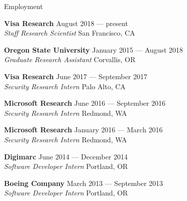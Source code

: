 \documentclass{resume} %
\begin{document}
\begin{rSection}{Employment}

{\bf Visa Research} \hfill {August 2018 --- present}\\
{\emph{Staff Research Scientist } \hfill {San Francisco, CA}}

{\bf Oregon State University} \hfill {January 2015 --- August 2018}\\
{\emph{Graduate Research Assistant} \hfill {Corvallis, OR}}

{\bf Visa Research} \hfill {June 2017 --- September 2017}\\
{\emph{Security Research Intern} \hfill {Palo Alto, CA}}

{\bf Microsoft Research} \hfill {June 2016 --- September 2016}\\
{\emph{Security Research Intern} \hfill {Redmond, WA}}

{\bf Microsoft Research} \hfill {January 2016 --- March 2016}\\
{\emph{Security Research Intern} \hfill {Redmond, WA}}

{\bf Digimarc} \hfill {June 2014 --- December 2014}\\
{\emph{Software Developer Intern} \hfill {Portland, OR}}

{\bf Boeing Company} \hfill {March 2013 --- September 2013}\\
{\emph{Software Developer Intern} \hfill {Portland, OR}}



\end{rSection}

\end{document}
